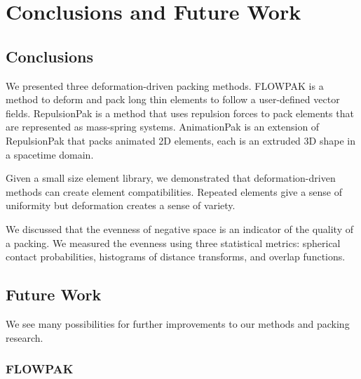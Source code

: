 
\chapter{Conclusions and Future Work}
\label{chapter_conclusions_and_future_work}

\section{Conclusions}

\newtext
{
We presented three deformation-driven packing methods.
FLOWPAK is a method to deform and pack long thin elements
to follow a user-defined vector fields.
RepulsionPak is a method that uses repulsion forces to pack
elements that are represented as mass-spring systems.
AnimationPak is an extension of RepulsionPak that packs animated 2D elements,
each is an extruded 3D shape in a spacetime domain.
}

\newtext
{
Given a small size element library, 
we demonstrated that deformation-driven methods can create element compatibilities.
Repeated elements give a sense of uniformity but deformation creates a sense of variety.
}

\newtext
{
We discussed that the evenness of negative space is an indicator of the quality of a packing.
We measured the evenness using three statistical metrics:
spherical contact probabilities, histograms of distance transforms, and overlap functions.
}

\section{Future Work}

\newtext
{
We see many possibilities for further improvements to our methods and packing research.
}

\subsection{FLOWPAK}


